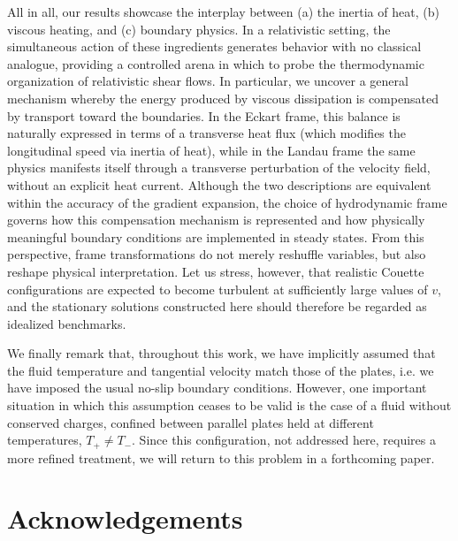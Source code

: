 \documentclass[a4paper, amsfonts, amssymb, amsmath, reprint, showkeys, nofootinbib, twoside,notitlepage,onecolumn]{revtex4-1}
\theoremstyle{definition}
\theoremstyle{theorem}
\begin{document}
All in all, our results showcase the interplay between (a) the inertia of heat, (b) viscous heating, and (c) boundary physics. In a relativistic setting, the simultaneous action of these ingredients generates behavior with no classical analogue, providing a controlled arena in which to probe the thermodynamic organization of relativistic shear flows. In particular, we uncover a general mechanism whereby the energy produced by viscous dissipation is compensated by transport toward the boundaries. In the Eckart frame, this balance is naturally expressed in terms of a transverse heat flux (which modifies the longitudinal speed via inertia of heat), while in the Landau frame the same physics manifests itself through a transverse perturbation of the velocity field, without an explicit heat current. Although the two descriptions are equivalent within the accuracy of the gradient expansion, the choice of hydrodynamic frame governs how this compensation mechanism is represented and how physically meaningful boundary conditions are implemented in steady states. From this perspective, frame transformations do not merely reshuffle variables, but also reshape physical interpretation. Let us stress, however, that realistic Couette configurations are expected to become turbulent at sufficiently large values of \(v\), and the stationary solutions constructed here should therefore be regarded as idealized benchmarks.



We finally remark that, throughout this work, we have implicitly assumed that the fluid temperature and tangential velocity match those of the plates, i.e. we have imposed the usual no-slip boundary conditions.
However, one important situation in which this assumption ceases to be valid is the case of a fluid without conserved charges, confined between parallel plates held at different temperatures, $T_+ \neq T_-$. Since this configuration, not addressed here, requires a more refined treatment, we will return to this problem in a forthcoming paper.




\section*{Acknowledgements}
\end{document}
